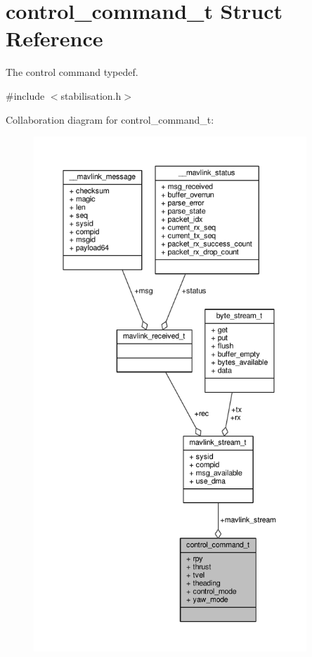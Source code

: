 \hypertarget{structcontrol__command__t}{\section{control\+\_\+command\+\_\+t Struct Reference}
\label{structcontrol__command__t}
}


The control command typedef.  




{\ttfamily \#include $<$stabilisation.\+h$>$}



Collaboration diagram for control\+\_\+command\+\_\+t\+:
\nopagebreak
\begin{figure}[H]
\begin{center}
\leavevmode
\includegraphics[height=550pt]{structcontrol__command__t__coll__graph}
\end{center}
\end{figure}
